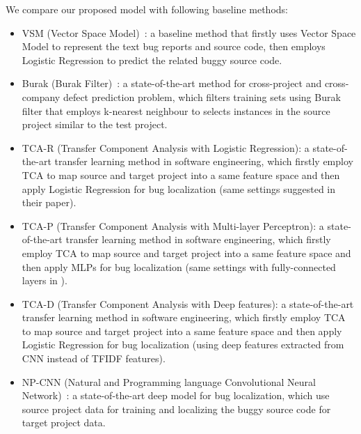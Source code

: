We compare our proposed model \TRANPCNN with following baseline methods:
\begin{itemize}
  \item VSM (Vector Space Model)~\cite{rao2011retrieval}: a baseline method that firstly uses Vector Space Model to represent the text bug reports and source code, then employs Logistic Regression to predict the related buggy source code.
  \item Burak (Burak Filter)~\cite{peters2013better}: a state-of-the-art method for cross-project and cross-company defect prediction problem, which filters training sets using Burak filter that employs k-nearest neighbour to selects instances in the source project similar to the test project.
  \item TCA-R (Transfer Component Analysis with Logistic Regression): a state-of-the-art transfer learning method in software engineering, which firstly employ TCA to map source and target project into a same feature space and then apply Logistic Regression for bug localization (same settings suggested in their paper). 
  \item TCA-P (Transfer Component Analysis with Multi-layer Perceptron): a state-of-the-art transfer learning method in software engineering, which firstly employ TCA to map source and target project into a same feature space and then apply MLPs for bug localization (same settings with fully-connected layers in \TRANPCNN).
   \item TCA-D (Transfer Component Analysis with Deep features): a state-of-the-art transfer learning method in software engineering, which firstly employ TCA to map source and target project into a same feature space and then apply Logistic Regression for bug localization (using deep features extracted from CNN instead of TFIDF features).
  \item NP-CNN (Natural and Programming language Convolutional Neural Network)~\cite{huo2016learning}: a state-of-the-art deep model for bug localization, which use source project data for training and localizing the buggy source code for target project data.
\end{itemize}

